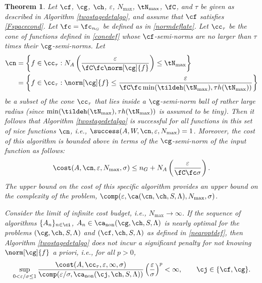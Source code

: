\documentclass[]{elsarticle}
\DeclareMathOperator{\fix}{non}
\newtheorem{theorem}{Theorem}
\theoremstyle{definition}
\theoremstyle{remark}
\begin{document}
\begin{theorem}  \label{TwoStageDetermThm}  Let  $\cf$, $\cg$, $\ch$, $\varepsilon$, $N_{\max}$, $\tN_{\max}$, $\fC$, and $\tau$ be given as described in Algorithm \ref{twostagedetalgo}, and assume that $\cf$ satisfies \eqref{Fspacecond}.  Let $\fc=\fc_{n_G}$ be defined as in \eqref{normdeflate}.
Let $\cc_\tau$ be the cone of functions defined in \eqref{conedef} whose $\cf$-semi-norms are no larger than $\tau$ times their $\cg$-semi-norms.  Let
\begin{align} 
\nonumber
\cn &= \left \{ f \in \cc_\tau : N_{A}\left(\frac{\varepsilon}{\fC \fc \norm[\cg]{f}} \right) \le \tN_{\max} \right\} \\
\label{nicefdef}
&= \left \{ f \in \cc_\tau : \norm[\cg]{f} \le \frac{\varepsilon}{\fC \fc \min(\tildeh(\tN_{\max}),\tau h(\tN_{\max}))} \right\}
\end{align}
be a subset of the cone $\cc_\tau$ that lies inside a $\cg$-semi-norm ball of rather large radius (since $\min(\tildeh(\tN_{\max}),\tau h(\tN_{\max}))$ is assumed to be tiny).  Then it follows that Algorithm \ref{twostagedetalgo} is successful for all functions in this set of \emph{nice} functions $\cn$,  i.e.,  $\success(A,W,\cn,\varepsilon,N_{\max}) = 1$.  Moreover, the cost of this algorithm is bounded above in terms of the $\cg$-semi-norm of the input function as follows:
\begin{equation} \label{auto2stagedetcost}
\cost(A,\cn,\varepsilon,N_{\max},\sigma)
\le n_G+ N_{A}\left(\frac{\varepsilon}{\fC \fc \sigma} \right).
\end{equation}
The upper bound on the cost of this specific algorithm provides an upper bound on the complexity of the problem, $\comp(\varepsilon,\ca(\cn,\ch,S,\Lambda),N_{\max},\sigma)$.  

Consider the limit of infinite cost budget, i.e., $N_{\max} \to \infty$.  If the sequence of algorithms $\{A_n\}_{n \in \ci}$, $A_n \in\ca_{\fix}(\cg,\ch,S,\Lambda)$  is nearly optimal for the problems $(\cg,\ch,S,\Lambda)$ and $(\cf,\ch,S,\Lambda)$ as defined in \eqref{nearoptdef}, then Algorithm \ref{twostagedetalgo} does not incur a significant penalty for not knowing $\norm[\cg]{f}$ a priori, i.e., for all $p>0$,
\begin{equation} \label{penalty}
\sup_{0 < \varepsilon/\sigma \le 1} \frac{\cost(A,\cc_{\tau},\varepsilon,\infty,\sigma)} {\comp(\varepsilon/\sigma,\ca_{\fix}(\cj,\ch,S,\Lambda))} \left(\frac{\varepsilon}{\sigma}\right)^p <\infty, \qquad \cj \in \{\cf,\cg\}.
\end{equation}
\end{theorem}
\end{document}
